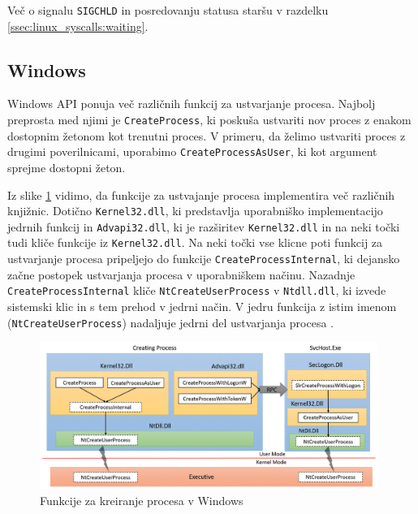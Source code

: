\documentclass[a4paper,12pt,openright]{book}
\begin{document}
Več o signalu \texttt{SIGCHLD} in posredovanju statusa staršu v razdelku \ref{ssec:linux_syscalls:waiting}.

\subsection{Windows}


Windows API ponuja več različnih funkcij za ustvarjanje procesa.
Najbolj preprosta med njimi je \texttt{CreateProcess}, ki poskuša ustvariti nov proces z enakom dostopnim žetonom kot trenutni proces.
V primeru, da želimo ustvariti proces z drugimi poverilnicami, uporabimo \texttt{CreateProcessAsUser}, ki kot argument sprejme dostopni žeton.

Iz slike \ref{fig:windows_createprocess_functions} vidimo, da funkcije za ustvajanje procesa implementira več različnih knjižnic.
Dotično \texttt{Kernel32.dll}, ki predstavlja uporabniško implementacijo jedrnih funkcij in \texttt{Advapi32.dll}, ki je razširitev \texttt{Kernel32.dll} in na neki točki tudi kliče funkcije iz \texttt{Kernel32.dll}.
Na neki točki vse klicne poti funkcij za ustvarjanje procesa pripeljejo do funkcije \texttt{CreateProcess\-Internal}, ki dejansko začne postopek ustvarjanja procesa v uporabniškem načinu.
Nazadnje \texttt{CreateProcessInternal} kliče \texttt{NtCreateUserProcess} v \texttt{Ntdll.dll}, ki izvede sistemski klic in s tem prehod v jedrni način.
V jedru funkcija z istim imenom (\texttt{NtCreateUserProcess}) nadaljuje jedrni del ustvarjanja procesa \cite{Yosifovich_Russinovich_Solomon_Ionescu_2017}.

\begin{figure}[h!]
	\begin{center}
		\includegraphics[width=0.98\textwidth]{images/windows_createprocess_functions.png}
	\end{center}
	\caption{Funkcije za kreiranje procesa v Windows \cite{Yosifovich_Russinovich_Solomon_Ionescu_2017}}
	\label{fig:windows_createprocess_functions}
\end{figure}
\end{document}
